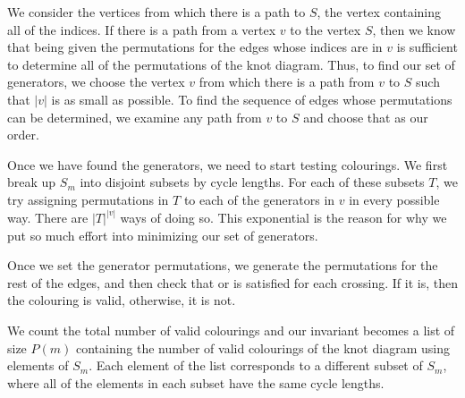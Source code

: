 \begin{paper}
We consider the vertices from which there is a path to $S$, the vertex
containing all of the indices.
If there is a path from a vertex $v$ to the vertex $S$, then we know that being
given the permutations for the edges whose indices are in $v$ is sufficient to
determine all of the permutations of the knot diagram.
Thus, to find our set of generators, we choose the vertex $v$ from which there
is a path from $v$ to $S$ such that $|v|$ is as small as possible.
To find the sequence of edges whose permutations can be determined, we examine
any path from $v$ to $S$ and choose that as our order.



\noindent{}

Once we have found the generators, we need to start testing colourings.
We first break up $S_m$ into disjoint subsets by cycle lengths.
For each of these subsets $T$, we try assigning permutations in $T$ to each of
the generators in $v$ in every possible way.
There are $|T|^{|v|}$ ways of doing so.
This exponential is the reason for why we put so much effort into minimizing our
set of generators.

Once we set the generator permutations, we generate the permutations for the
rest of the edges, and then check that \eqRight or \eqLeft is satisfied for each
crossing.
If it is, then the colouring is valid, otherwise, it is not.

\noindent{}

\noindent{}

We count the total number of valid colourings and our invariant becomes a list
of size $P(m)$ containing the number of valid colourings of the knot diagram
using elements of $S_m$.
Each element of the list corresponds to a different subset of $S_m$, where all
of the elements in each subset have the same cycle lengths.


\end{paper}
